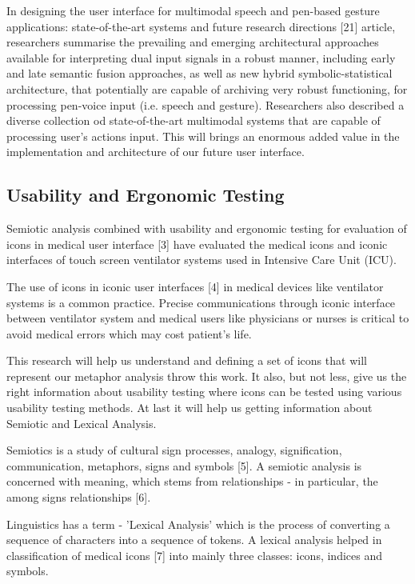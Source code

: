 In designing the user interface for multimodal speech and pen-based gesture applications: state-of-the-art systems and future research directions [21] article, researchers summarise the prevailing and emerging architectural approaches available for interpreting dual input signals in a robust manner, including early and late semantic fusion approaches, as well as new hybrid symbolic-statistical architecture, that potentially are capable of archiving very robust functioning, for processing pen-voice input (i.e. speech and gesture). Researchers also described a diverse collection od state-of-the-art multimodal systems that are capable of processing user's actions input. This will brings an enormous added value in the implementation and architecture of our future user interface.



\subsection{Usability and Ergonomic Testing}

Semiotic analysis combined with usability and ergonomic testing for evaluation of icons in medical user interface [3] have evaluated the medical icons and iconic interfaces of touch screen ventilator systems used in Intensive Care Unit (ICU).

The use of icons in iconic user interfaces [4] in medical devices like ventilator systems is a common practice. Precise communications through iconic interface between ventilator system and medical users like physicians or nurses is critical to avoid medical errors which may cost patient's life.

This research will help us understand and defining a set of icons that will represent our metaphor analysis throw this work. It also, but not less, give us the right information about usability testing where icons can be tested using various usability testing methods. At last it will help us getting information about Semiotic and Lexical Analysis.

Semiotics is a study of cultural sign processes, analogy, signification, communication, metaphors, signs and symbols [5]. A semiotic analysis is concerned with meaning, which stems from relationships - in particular, the among signs relationships [6].

Linguistics has a term - 'Lexical Analysis' which is the process of converting a sequence of characters into a sequence of tokens. A lexical analysis helped in classification of medical icons [7] into mainly three classes: icons, indices and symbols.

